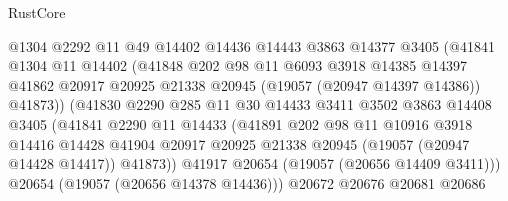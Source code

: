\begin{lexlean}{RustCore}
\begin{coremodule}
                            @1304
                            @2292
                            @11
                            @49
                            @14402
                            @14436
                            @14443
                            @3863
                            @14377
                            @3405
                            (@41841
                              @1304
                              @11
                              @14402
                              (@41848
                                @202
                                @98
                                @11
                                @6093
                                @3918
                                @14385
                                @14397
                                @41862
                                @20917
                                @20925
                                @21338
                                @20945
                                (@19057 (@20947 @14397 @14386))
                                @41873))
                            (@41830
                              @2290
                              @285
                              @11
                              @30
                              @14433
                              @3411
                              @3502
                              @3863
                              @14408
                              @3405
                              (@41841
                                @2290
                                @11
                                @14433
                                (@41891
                                  @202
                                  @98
                                  @11
                                  @10916
                                  @3918
                                  @14416
                                  @14428
                                  @41904
                                  @20917
                                  @20925
                                  @21338
                                  @20945
                                  (@19057 (@20947 @14428 @14417))
                                  @41873))
                              @41917
                              @20654
                              (@19057 (@20656 @14409 @3411)))
                            @20654
                            (@19057 (@20656 @14378 @14436)))
                          @20672
                          @20676
                          @20681
                          @20686

\end{coremodule}
\end{lexlean}
